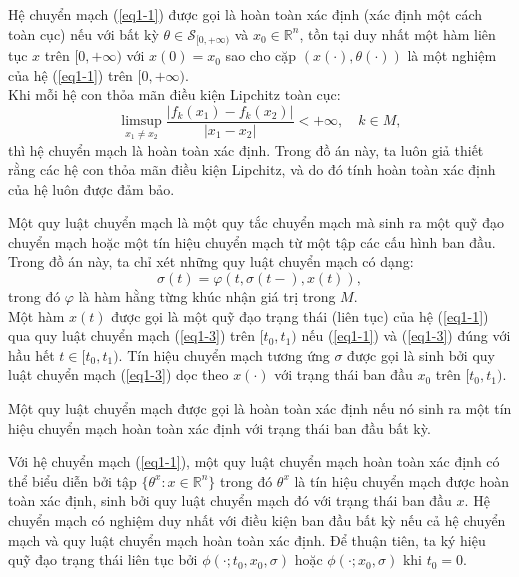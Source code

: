 \documentclass[14pt,a4paper,oneside]{report}		%
\theoremstyle{definition}
\begin{document}
Hệ chuyển mạch (\ref{eq1-1}) được gọi là hoàn toàn xác định (xác định một cách toàn cục) nếu với bất kỳ $\theta\in\mathcal{S}_{[0,+\infty)}$ và $x_0\in\mathbb{R}^n$, tồn tại duy nhất một hàm liên tục $x$ trên $[0,+\infty)$ với $x(0)=x_0$ sao cho cặp $(x(\cdot),\theta(\cdot))$ là một nghiệm của hệ (\ref{eq1-1}) trên $[0,+\infty)$.\\
Khi mỗi hệ con thỏa mãn điều kiện Lipchitz toàn cục:
$$\limsup_{x_1\neq x_2}\frac{|f_k(x_1)-f_k(x_2)|}{|x_1-x_2|} < +\infty,\quad k\in M,$$
thì hệ chuyển mạch là hoàn toàn xác định. Trong đồ án này, ta luôn giả thiết rằng các hệ con thỏa mãn điều kiện Lipchitz, và do đó tính hoàn toàn xác định của hệ luôn được đảm bảo.

Một quy luật chuyển mạch là một quy tắc chuyển mạch mà sinh ra một quỹ đạo chuyển mạch hoặc một tín hiệu chuyển mạch từ một tập các cấu hình ban đầu. Trong đồ án này, ta chỉ xét những quy luật chuyển mạch có dạng:
\begin{equation} \label{eq1-3}
\sigma(t)=\varphi(t,\sigma(t-),x(t)),
\end{equation} 
trong đó $\varphi$ là hàm hằng từng khúc nhận giá trị trong $M$.\\
Một hàm $x(t)$ được gọi là một quỹ đạo trạng thái (liên tục) của hệ (\ref{eq1-1}) qua quy luật chuyển mạch (\ref{eq1-3}) trên $[t_0,t_1)$ nếu (\ref{eq1-1}) và (\ref{eq1-3}) đúng với hầu hết $t\in[t_0,t_1)$. Tín hiệu chuyển mạch tương ứng $\sigma$ được gọi là sinh bởi quy luật chuyển mạch (\ref{eq1-3}) dọc theo $x(\cdot)$ với trạng thái ban đầu $x_0$ trên $[t_0,t_1)$.

Một quy luật chuyển mạch được gọi là hoàn toàn xác định nếu nó sinh ra một tín hiệu chuyển mạch hoàn toàn xác định với trạng thái ban đầu bất kỳ.

Với hệ chuyển mạch (\ref{eq1-1}), một quy luật chuyển mạch hoàn toàn xác định có thể biểu diễn bởi tập $\{\theta^x:x\in\mathbb{R}^n\}$ trong đó $\theta^x$ là tín hiệu chuyển mạch được hoàn toàn xác định, sinh bởi quy luật chuyển mạch đó với trạng thái ban đầu $x$. Hệ chuyển mạch có nghiệm duy nhất với điều kiện ban đầu bất kỳ nếu cả hệ chuyển mạch và quy luật chuyển mạch hoàn toàn xác định. Để thuận tiên, ta ký hiệu quỹ đạo trạng thái liên tục bởi $\phi(\cdot;t_0,x_0,\sigma)$ hoặc $\phi(\cdot;x_0,\sigma)$ khi $t_0=0$.
\end{document}
